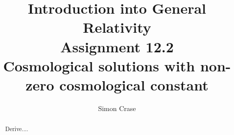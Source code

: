 \documentclass[]{article}
\title{Introduction into General Relativity\\Assignment 12.2\\Cosmological solutions with non-zero cosmological constant}
\author{Simon Crase}
\begin{document}
\maketitle

\begin{abstract}
Derive....
\end{abstract}

\section{}
\end{document}
